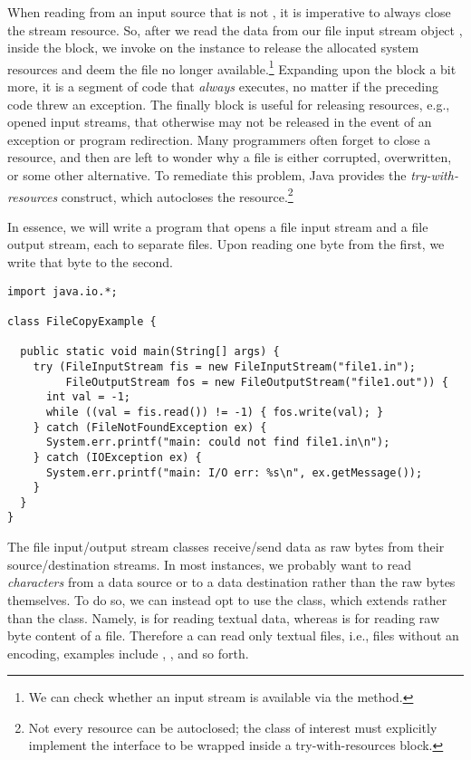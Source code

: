 When reading from an input source that is not , it is imperative to always close the stream resource.
So, after we read the data from our file input stream object , inside the  block, we invoke  on the instance to release the allocated system resources and deem the file no longer available.\footnote{We can check whether an input stream is available via the  method.} 
Expanding upon the  block a bit more, it is a segment of code that \emph{always} executes, no matter if the preceding code threw an exception. The finally block is useful for releasing resources, e.g., opened input streams, that otherwise may not be released in the event of an exception or program redirection. 
Many programmers often forget to close a resource, and then are left to wonder why a file is either corrupted, overwritten, or some other alternative. 
To remediate this problem, Java provides the \emph{try-with-resources} construct, which autocloses the resource.\footnote{Not every resource can be autoclosed; the class of interest must explicitly implement the  interface to be wrapped inside a try-with-resources block.}

In essence, we will write a program that opens a file input stream and a file output stream, each to separate files. Upon reading one byte from the first, we write that byte to the second.

\begin{lstlisting}[language=MyJava]
import java.io.*;

class FileCopyExample {

  public static void main(String[] args) {
    try (FileInputStream fis = new FileInputStream("file1.in");
         FileOutputStream fos = new FileOutputStream("file1.out")) {
      int val = -1;
      while ((val = fis.read()) != -1) { fos.write(val); }
    } catch (FileNotFoundException ex) {
      System.err.printf("main: could not find file1.in\n");
    } catch (IOException ex) {
      System.err.printf("main: I/O err: %s\n", ex.getMessage());
    }
  }
}
\end{lstlisting}

The file input/output stream classes receive/send data as raw bytes from their source/destination streams. 
In most instances, we probably want to read \emph{characters} from a data source or to a data destination rather than the raw bytes themselves.
To do so, we can instead opt to use the  class, which extends  rather than the  class. 
Namely,  is for reading textual data, whereas  is for reading raw byte content of a file. 
Therefore a  can read only textual files, i.e., files without an encoding, examples include , , and so forth.

